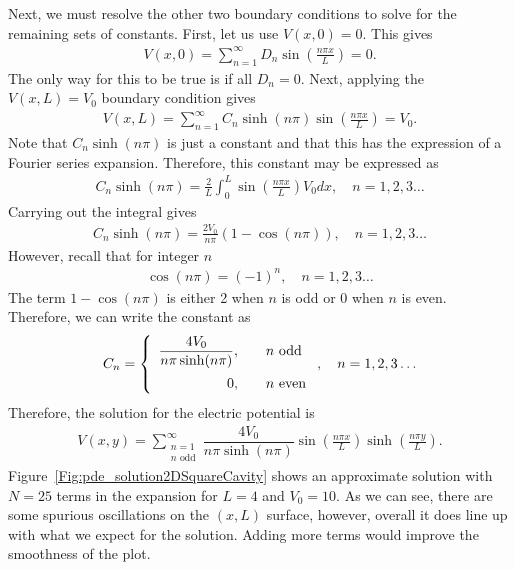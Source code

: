 Next, we must resolve the other two boundary conditions to solve for the remaining sets of constants. First, let us use $V(x,0) = 0$. This gives
\begin{align}
  V(x,0) = \sum_{n=1}^\infty  D_n \sin \left( \frac{n\pi x}{L} \right) = 0 .
\end{align}
The only way for this to be true is if all $D_n = 0$. Next, applying the $V(x,L) = V_0$ boundary condition gives
\begin{align}
  V(x,L) = \sum_{n=1}^\infty  C_n \sinh ( n \pi ) \sin \left( \frac{n\pi x}{L} \right) = V_0 .
\end{align}
Note that $C_n \sinh ( n \pi )$ is just a constant and that this has the expression of a Fourier series expansion. Therefore, this constant may be expressed as
\begin{align}
  C_n \sinh ( n \pi ) = \frac{2}{L} \int_0^L \sin \left( \frac{n\pi x}{L} \right) V_0 dx ,  \quad n = 1, 2, 3 \ldots 
\end{align}
Carrying out the integral gives
\begin{align}
  C_n \sinh ( n \pi ) = \frac{2 V_0}{n\pi} \left( 1 - \cos( n \pi) \right) ,  \quad n = 1, 2, 3 \ldots 
\end{align}
However, recall that for integer $n$
\begin{align}
  \cos ( n \pi ) = (-1)^n ,  \quad n = 1, 2, 3 \ldots  \nonumber
\end{align}
The term $1 - \cos(n \pi)$ is either 2 when $n$ is odd or 0 when $n$ is even. Therefore, we can write the constant as
\begin{align}
  C_n  = \left\{ \begin{array}{r l}
  \dfrac{4 V_0}{n\pi \sinh ( n \pi )}, & \quad n \text{ odd} \vspace{0.2cm} \\
  0, & \quad n \text{ even} \\ \end{array} \right. ,  \quad n = 1, 2, 3 \ldots 
\end{align}
Therefore, the solution for the electric potential is
\begin{align}
  V(x,y) = \sum_{\substack{n=1 \\ n \text{ odd}}}^\infty  \dfrac{4 V_0}{n\pi \sinh ( n \pi )} \sin \left( \frac{n\pi x}{L} \right) \sinh \left( \frac{n\pi y}{L} \right) .
\end{align}
Figure~\ref{Fig:pde_solution2DSquareCavity} shows an approximate solution with $N = 25$ terms in the expansion for $L = 4$ and $V_0 = 10$. As we can see, there are some spurious oscillations on the $(x,L)$ surface, however, overall it does line up with what we expect for the solution. Adding more terms would improve the smoothness of the plot.

